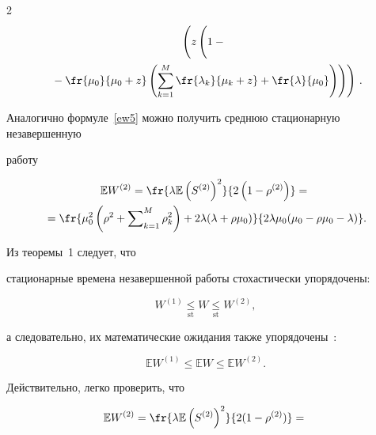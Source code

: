 \begin{multicols}{2}
\begin{multline*}
\left(z\left(


\vphantom{\left(\sum\limits_{k=1}^M\right)}


1-{}\right.\right.\\


\left.\left.{}-\fr{\mu_0}{\mu_0+z}\left(\sum\limits_{k=1}^M \fr{\lambda_k}{\mu_k+z}  +\fr{\lambda}{\mu_0}\right)\right)\right)\,.


\end{multline*}


Аналогично формуле~\eqref{ew5} можно получить среднюю стационарную незавершенную 


работу


\begin{multline}


\label{ew6}


\mathbb{E}  W^{(2)} = \fr{\lambda \mathbb{E} \left( S^{(2)}\right)^2}{2\left(1-\rho^{(2)}\right)} = {}\\


{}=


\fr{\mu_0^2\left(\rho^2 + \sum\nolimits_{k=1}^M \rho_k^2 \right) +2 \lambda (\lambda +\rho \mu_0)}{2\lambda \mu_0 (\mu_0 -\rho \mu_0 -\lambda)}.


\end{multline}











Из теоремы~1 следует, что


стационарные времена незавершенной работы стохастически упорядочены:


 $$


 W^{(1)}\underset{\mathrm{st}}\le W \underset{\mathrm{st}}\le W^{(2)},


 $$


а следовательно,  их математические ожидания также упорядочены~\cite{Ross}:


$$


 \mathbb{E} W^{(1)}\le \mathbb{E} W \le \mathbb{E} W^{(2)}.


$$





Действительно, легко проверить, что


\begin{multline*}


\mathbb{E}  W^{(2)} = \fr{\lambda \mathbb{E} \left( S^{(2)}\right)^2}{2(1-\rho^{(2)})} = {}\\



\end{multline*}
\end{multicols}
